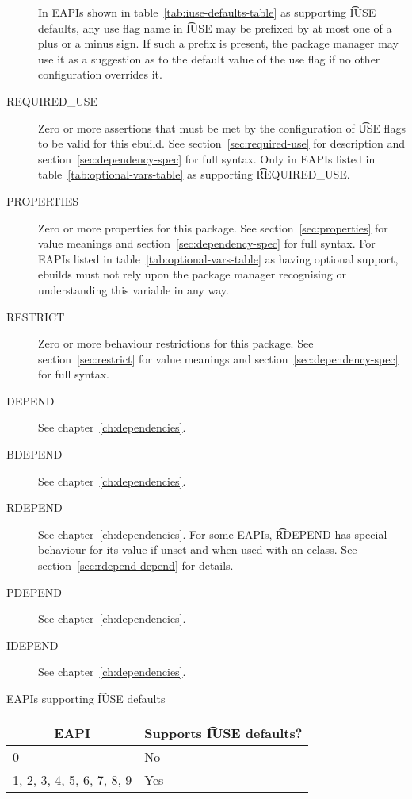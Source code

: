 \begin{description}
     In EAPIs shown in table~\ref{tab:iuse-defaults-table} as supporting
    \t{IUSE} defaults, any use flag name in \t{IUSE} may be prefixed by at most one of a plus or a
    minus sign. If such a prefix is present, the package manager may use it as a suggestion as to
    the default value of the use flag if no other configuration overrides it.
\item[REQUIRED_USE]  Zero or more assertions that must be met by the
    configuration of \t{USE} flags to be valid for this ebuild. See section~\ref{sec:required-use}
    for description and section~\ref{sec:dependency-spec} for full syntax. Only in EAPIs listed in
    table~\ref{tab:optional-vars-table} as supporting \t{REQUIRED_USE}.
\item[PROPERTIES]  Zero or more properties for this package.
    See section~\ref{sec:properties} for value meanings and section~\ref{sec:dependency-spec} for
    full syntax. For EAPIs listed in table~\ref{tab:optional-vars-table} as having optional support,
    ebuilds must not rely upon the package manager recognising or understanding this variable in
    any way.
\item[RESTRICT] Zero or more behaviour restrictions for this package. See section~\ref{sec:restrict}
    for value meanings and section~\ref{sec:dependency-spec} for full syntax.
\item[DEPEND] See chapter~\ref{ch:dependencies}.
\item[BDEPEND] See chapter~\ref{ch:dependencies}.
\item[RDEPEND] See chapter~\ref{ch:dependencies}. For some EAPIs, \t{RDEPEND} has special behaviour
    for its value if unset and when used with an eclass. See section~\ref{sec:rdepend-depend} for
    details.
\item[PDEPEND] See chapter~\ref{ch:dependencies}.
\item[IDEPEND] See chapter~\ref{ch:dependencies}.
\end{description}

\begin{centertable}{EAPIs supporting \t{IUSE} defaults}
    \label{tab:iuse-defaults-table}
    \begin{tabular}{ll}
      \toprule
      \multicolumn{1}{c}{\textbf{EAPI}} &
      \multicolumn{1}{c}{\textbf{Supports \t{IUSE} defaults?}} \\
      \midrule
      0                         & No  \\
      1, 2, 3, 4, 5, 6, 7, 8, 9 & Yes \\
      \bottomrule
    \end{tabular}
\end{centertable}

